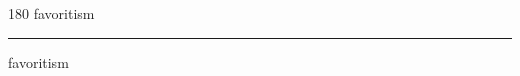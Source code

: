 
\begin{frame}
\begin{center}
\begin{turn}{180}
{\fontsize{2.5cm}{1em}\selectfont favoritism}
\end{turn}
\vspace{1em}\par  
\hrule
\vspace{1em}\par  
{\fontsize{2.5cm}{1em}\selectfont favoritism}
\end{center}
\end{frame}
